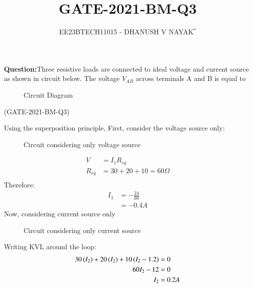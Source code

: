 \documentclass[journal,12pt,twocolumn]{IEEEtran}
\theoremstyle{remark}
\begin{document}

\title{GATE-2021-BM-Q3}
\author{EE23BTECH11015 - DHANUSH V NAYAK$^{*}$%
}
\maketitle
\newpage
\bigskip
\renewcommand{\thefigure}{\arabic{figure}}
\renewcommand{\thetable}{\theenumi}
\textbf{Question:}Three resistive loads are connected to ideal voltage and current source as shown in circuit below. The voltage $V_{AB}$ across terminals A and B is equal to 
\begin{figure}[H] 
    \centering
    
    \caption{Circuit Diagram}
    \label{fig:gate_21_bm_q3_ckt}
\end{figure}
\hfill(GATE-2021-BM-Q3)\\
\solution 

Using the superposition principle, First, consider the voltage source only:
\begin{figure}[H] 
    \centering
    \caption{Circuit considering only voltage source}
    \label{fig:gate_21_bm_q3_ckt_1}
\end{figure}
\begin{align}
    V &= I_{1}R_{eq}\\
    R_{eq} &= 30 + 20 + 10 = 60 \Omega\\
\end{align}
Therefore:
\begin{align}
    I_{1} &= -\frac{24}{60} \\
         &= -0.4 A\label{eq:gate21_Bm_q3_I1_result}
\end{align}
Now, considering current source only 
\begin{figure}[H] 
    \centering
    \caption{Circuit considering only current source}
    \label{fig:gate_21_bm_q3_ckt_2}
\end{figure}
Writing KVL around the loop:
\begin{align}
    30\left(I_2\right) + 20\left(I_2\right) + 10\left(I_2-1.2\right) &=0\\
    60I_2 -12 &=0\\
    I_2&= 0.2 A \label{eq:gate21_bm_q3_I2_res}
\end{align}
     
\end{document}
